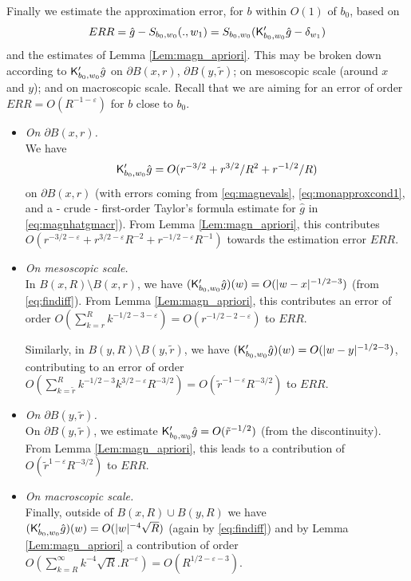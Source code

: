 \documentclass[10pt]{article}
\newcommand{\eps}{\varepsilon}
\newcommand{\rK}{{\sf K}}
\begin{document}
Finally we estimate the approximation error, for $b$ within $O(1)$ of $b_0$, based on
$$ERR=\hat g-S_{b_0,w_0}(.,w_1)=S_{b_0,w_0}(\rK'_{b_0,w_0}\hat g-\delta_{w_1})$$
and the estimates of Lemma \ref{Lem:magn_apriori}. This may be broken down according to $\rK'_{b_0,w_0}\hat g$ on $\partial B(x,r)$, $\partial B(y,\tilde r)$; on mesoscopic scale (around $x$ and $y$); and on macroscopic scale. Recall that we are aiming for an error of order $ERR=O(R^{-1-\eps})$ for $b$ close to $b_0$.
\begin{itemize}
\item {\em On $\partial B(x,r)$.}\\ 
We have 
$$\rK'_{b_0,w_0}\hat g=O(r^{-3/2}+r^{3/2}/R^2+r^{-1/2}/R)$$%
on $\partial B(x,r)$ (with errors coming from \eqref{eq:magnevals}, \eqref{eq:monapproxcond1}, and a - crude - first-order Taylor's formula estimate for $\hat g$ in \eqref{eq:magnhatgmacr}). From Lemma \ref{Lem:magn_apriori}, this contributes $O(r^{-3/2-\eps}+r^{3/2-\eps}R^{-2}+r^{-1/2-\eps}R^{-1})$ towards the estimation error $ERR$.
\item {\em On mesoscopic scale.\\}
In $B(x,R)\setminus B(x,r)$, we have $(\rK'_{b_0,w_0}\hat g)(w)=O(|w-x|^{-1/2-3})$ (from \eqref{eq:findiff}). From Lemma \ref{Lem:magn_apriori}, this contributes an error of order $O(\sum_{k=r}^R k^{-1/2-3-\eps})=O(r^{-1/2-2-\eps})$ to $ERR$.

Similarly, in $B(y,R)\setminus B(y,\tilde r)$, we have $(\rK'_{b_0,w_0}\hat g)(w)=O(|w-y|^{-1/2-3})$, contributing to an error of order $O(\sum_{k=\tilde r}^R k^{-1/2-3}k^{3/2-\eps} R^{-3/2})=O(\tilde r^{-1-\eps}R^{-3/2})$ to $ERR$.

\item{\em On $\partial B(y,\tilde r)$.\\} 
On $\partial B(y,\tilde r)$, we estimate $\rK'_{b_0,w_0}\hat g=O(\tilde r^{-1/2})$ (from the discontinuity). From Lemma \ref{Lem:magn_apriori}, this leads to
a contribution of
 $O(\tilde r^{1-\eps}R^{-3/2})$ to $ERR$.
 
 \item{\em On macroscopic scale.\\} 
Finally, outside of $B(x,R)\cup B(y,R)$ we have $(\rK'_{b_0,w_0}\hat g)(w)=O(|w|^{-4}\sqrt R)$ (again by \eqref{eq:findiff}) and by Lemma \ref{Lem:magn_apriori} a contribution of order $O(\sum_{k=R}^\infty k^{-4}\sqrt R.R^{-\eps})=O(R^{1/2-\eps-3})$.\\
\end{itemize}
\end{document}
